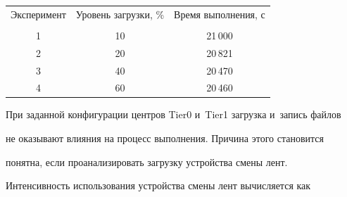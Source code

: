   \begin{table}\small


  \begin{center}


  \parbox{270pt}{





}





  \vspace*{2ex}





  \begin{tabular}{|c|c|c|}


  \hline


Эксперимент&Уровень загрузки, \%&Время выполнения, с\\


&&\\[-10pt]


\hline


1&10&21\,000\\


2&20&20\,821\\


3&40&20\,470\\


4&60&20\,460\\


\hline


\end{tabular}


\end{center}


\vspace*{-6pt}


\end{table}





  При заданной конфигурации центров Tier0 и~Tier1 загрузка и~запись файлов


не оказывают влияния на процесс выполнения. Причина этого становится


понятна, если проанализировать загрузку устройства смены лент.





  Интенсивность использования устройства смены лент вычисляется как


